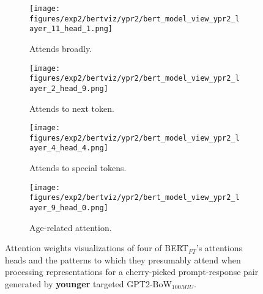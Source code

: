 \begin{figure}[H]
     \centering
     \begin{subfigure}[b]{0.22\textwidth}
        \centering
        \texttt{[image: figures/exp2/bertviz/ypr2/bert\_model\_view\_ypr2\_layer\_11\_head\_1.png]}
        \captionsetup{font=footnotesize,labelfont=footnotesize}
        \caption{Attends broadly.}
        \label{subfig:bertviz_model_view_ypr2_broad}
     \end{subfigure}
     \quad
     \begin{subfigure}[b]{0.22\textwidth}
        \centering
        \texttt{[image: figures/exp2/bertviz/ypr2/bert\_model\_view\_ypr2\_layer\_2\_head\_9.png]}
        \captionsetup{font=footnotesize,labelfont=footnotesize}
        \caption{Attends to next token.}
        \label{subfig:bertviz_model_view_ypr2_next}
     \end{subfigure}
    \quad
    \begin{subfigure}[b]{0.22\textwidth}
        \centering
        \texttt{[image: figures/exp2/bertviz/ypr2/bert\_model\_view\_ypr2\_layer\_4\_head\_4.png]}
        \captionsetup{font=footnotesize,labelfont=footnotesize}
        \caption{Attends to special tokens.}
        \label{subfig:bertviz_model_view_ypr2_special}
     \end{subfigure}
    \quad
     \begin{subfigure}[b]{0.22\textwidth}
        \centering
        \texttt{[image: figures/exp2/bertviz/ypr2/bert\_model\_view\_ypr2\_layer\_9\_head\_0.png]}
        \captionsetup{font=footnotesize,labelfont=footnotesize}
        \caption{Age-related attention.}
        \label{subfig:bertviz_model_view_ypr2_age}
     \end{subfigure}
    \caption{Attention weights visualizations of four of BERT$_{FT}$'s attentions heads and the patterns to which they presumably attend when processing representations for a cherry-picked prompt-response pair generated by \textbf{younger} targeted GPT2-BoW$_{100MIU}$. }
    \label{fig:bertviz_model_view_ypr2}
\end{figure}

